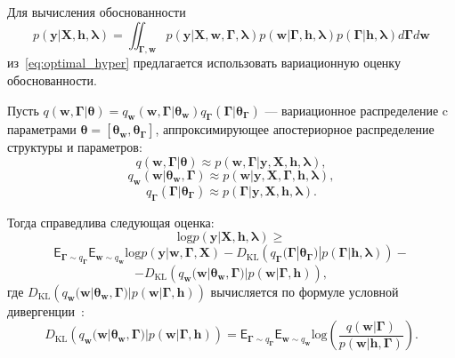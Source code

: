 Для вычисления обоснованности $$p(\mathbf{y}|\mathbf{X}, \mathbf{h}, \boldsymbol{\lambda}) = \iint_{\boldsymbol{\Gamma},\mathbf{w}}p(\mathbf{y}|\mathbf{X}, \mathbf{w}, \boldsymbol{\Gamma},\boldsymbol{\lambda})p(\mathbf{w}|\boldsymbol{\Gamma},\mathbf{h}, \boldsymbol{\lambda})p(\boldsymbol{\Gamma}|\mathbf{h}, \boldsymbol{\lambda})d\boldsymbol{\Gamma}d\mathbf{w}$$ из~\eqref{eq:optimal_hyper} предлагается использовать вариационную оценку обоснованности.

\begin{theorem}
Пусть $q(\mathbf{w},\boldsymbol{\Gamma}|\boldsymbol{\theta})  = q_\mathbf{w}(\mathbf{w},\boldsymbol{\Gamma}|\boldsymbol{\theta}_\mathbf{w})q_{\boldsymbol{\Gamma}}(\boldsymbol{\Gamma}|\boldsymbol{\theta}_{\boldsymbol{\Gamma}})$ --- вариационное распределение c параметрами $\boldsymbol{\theta}= [\boldsymbol{\theta}_\mathbf{w},\boldsymbol{\theta}_{\boldsymbol{\Gamma}} ]$, аппроксимирующее апостериорное распределение структуры и параметров:
\[
    q(\mathbf{w},\boldsymbol{\Gamma}|\boldsymbol{\theta}) \approx p(\mathbf{w},\boldsymbol{\Gamma}|\mathbf{y}, \mathbf{X}, \mathbf{h}, \boldsymbol{\lambda}),
\]
\[
    q_{\mathbf{w}}(\mathbf{w}|\boldsymbol{\theta}_\mathbf{w},\boldsymbol{\Gamma}) \approx p(\mathbf{w}|\mathbf{y}, \mathbf{X},  \boldsymbol{\Gamma},\mathbf{h}, \boldsymbol{\lambda}),
\]
\[
    q_{\boldsymbol{\Gamma}}(\boldsymbol{\Gamma}|\boldsymbol{\theta}_{\boldsymbol{\Gamma}}) \approx p(\boldsymbol{\Gamma}|\mathbf{y}, \mathbf{X},  \mathbf{h}, \boldsymbol{\lambda}).
\]

Тогда справедлива следующая оценка:
\begin{equation}
\label{eq:full_elbo}
\text{log} p(\mathbf{y}|\mathbf{X}, \mathbf{h}, \boldsymbol{\lambda}) \geq
\end{equation}
\[
 \mathsf{E}_{\boldsymbol{\Gamma} \sim q_{\boldsymbol{\Gamma}}}\mathsf{E}_{\mathbf{w} \sim q_{\mathbf{w}}} \text{log}p(\mathbf{y}|\mathbf{w}, \boldsymbol{\Gamma}, \mathbf{X})-D_\text{KL}\left(q_{\boldsymbol{\Gamma}}(\boldsymbol{\Gamma}|\boldsymbol{\theta}_{\boldsymbol{\Gamma}})|p(\boldsymbol{\Gamma}|\mathbf{h}, \boldsymbol{\lambda})\right) -
\]
\[
-D_\text{KL}\left(q_{\mathbf{w}}(\mathbf{w}|\boldsymbol{\theta}_\mathbf{w},\boldsymbol{\Gamma})|p(\mathbf{w}|\boldsymbol{\Gamma}, \mathbf{h})\right),
\]
где $D_\text{KL}\left(q_{\mathbf{w}}(\mathbf{w}|\boldsymbol{\theta}_\mathbf{w},\boldsymbol{\Gamma})|p(\mathbf{w}|\boldsymbol{\Gamma}, \mathbf{h})\right)$ вычисляется по формуле условной дивергенции~\cite{TODO}:
\[
D_\text{KL}\left(q_{\mathbf{w}}(\mathbf{w}|\boldsymbol{\theta}_\mathbf{w},\boldsymbol{\Gamma})|p(\mathbf{w}|\boldsymbol{\Gamma}, \mathbf{h})\right) = \mathsf{E}_{\boldsymbol{\Gamma} \sim q_{\boldsymbol{\Gamma}}} \mathsf{E}_{\mathbf{w} \sim q_{\mathbf{w}}} \text{log}\left(\frac{q(\mathbf{w}|\boldsymbol{\Gamma})}{p(\mathbf{w}|\mathbf{h},\boldsymbol{\Gamma})}\right).
\]
\end{theorem}

